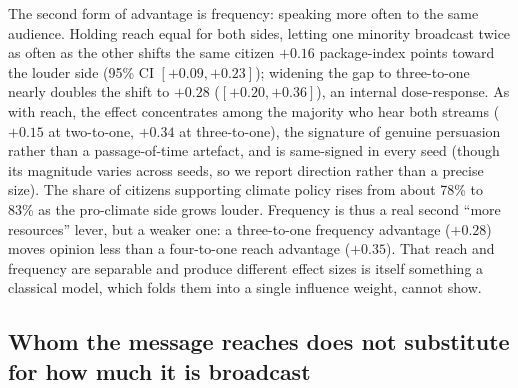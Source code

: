 \documentclass[pdflatex,sn-mathphys-num]{sn-jnl}%
\theoremstyle{thmstyleone}%
\theoremstyle{thmstyletwo}%
\theoremstyle{thmstylethree}%
\begin{document}
The second form of advantage is frequency: speaking more often to the same audience.
Holding reach equal for both sides, letting one minority broadcast twice as often as the
other shifts the same citizen $+0.16$ package-index points toward the louder side (95\%
CI $[+0.09, +0.23]$); widening the gap to three-to-one nearly doubles the shift to
$+0.28$ ($[+0.20, +0.36]$), an internal dose-response. As with reach, the effect
concentrates among the majority who hear both streams ($+0.15$ at two-to-one, $+0.34$ at
three-to-one), the signature of genuine persuasion rather than a passage-of-time
artefact, and is same-signed in every seed (though its magnitude varies across seeds, so
we report direction rather than a precise size). The share of citizens supporting
climate policy rises from about 78\% to 83\% as the pro-climate side grows louder.
Frequency is thus a real second ``more resources'' lever, but a weaker one: a
three-to-one frequency advantage ($+0.28$) moves opinion less than a four-to-one reach
advantage ($+0.35$). That reach and frequency are separable and produce different
effect sizes is itself something a classical model, which folds them into a single
influence weight, cannot show.

\subsection{Whom the message reaches does not substitute for how much it is broadcast}\label{subsec:bite-target}
\end{document}
